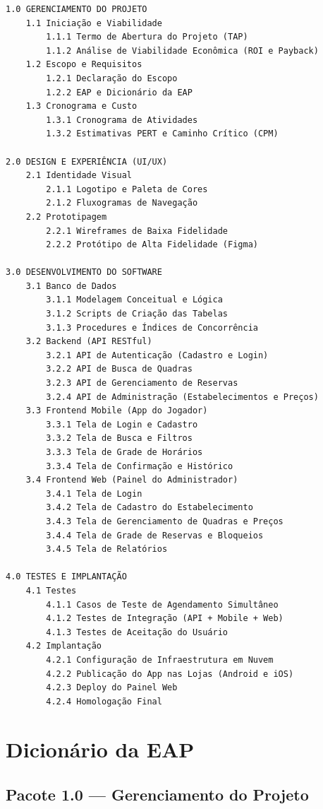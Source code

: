 \documentclass[12pt,a4paper,oneside]{report}
\begin{document}
\begin{footnotesize}
\begin{verbatim}
1.0 GERENCIAMENTO DO PROJETO
    1.1 Iniciação e Viabilidade
        1.1.1 Termo de Abertura do Projeto (TAP)
        1.1.2 Análise de Viabilidade Econômica (ROI e Payback)
    1.2 Escopo e Requisitos
        1.2.1 Declaração do Escopo
        1.2.2 EAP e Dicionário da EAP
    1.3 Cronograma e Custo
        1.3.1 Cronograma de Atividades
        1.3.2 Estimativas PERT e Caminho Crítico (CPM)

2.0 DESIGN E EXPERIÊNCIA (UI/UX)
    2.1 Identidade Visual
        2.1.1 Logotipo e Paleta de Cores
        2.1.2 Fluxogramas de Navegação
    2.2 Prototipagem
        2.2.1 Wireframes de Baixa Fidelidade
        2.2.2 Protótipo de Alta Fidelidade (Figma)

3.0 DESENVOLVIMENTO DO SOFTWARE
    3.1 Banco de Dados
        3.1.1 Modelagem Conceitual e Lógica
        3.1.2 Scripts de Criação das Tabelas
        3.1.3 Procedures e Índices de Concorrência
    3.2 Backend (API RESTful)
        3.2.1 API de Autenticação (Cadastro e Login)
        3.2.2 API de Busca de Quadras
        3.2.3 API de Gerenciamento de Reservas
        3.2.4 API de Administração (Estabelecimentos e Preços)
    3.3 Frontend Mobile (App do Jogador)
        3.3.1 Tela de Login e Cadastro
        3.3.2 Tela de Busca e Filtros
        3.3.3 Tela de Grade de Horários
        3.3.4 Tela de Confirmação e Histórico
    3.4 Frontend Web (Painel do Administrador)
        3.4.1 Tela de Login
        3.4.2 Tela de Cadastro do Estabelecimento
        3.4.3 Tela de Gerenciamento de Quadras e Preços
        3.4.4 Tela de Grade de Reservas e Bloqueios
        3.4.5 Tela de Relatórios

4.0 TESTES E IMPLANTAÇÃO
    4.1 Testes
        4.1.1 Casos de Teste de Agendamento Simultâneo
        4.1.2 Testes de Integração (API + Mobile + Web)
        4.1.3 Testes de Aceitação do Usuário
    4.2 Implantação
        4.2.1 Configuração de Infraestrutura em Nuvem
        4.2.2 Publicação do App nas Lojas (Android e iOS)
        4.2.3 Deploy do Painel Web
        4.2.4 Homologação Final
\end{verbatim}
\end{footnotesize}

\section{Dicionário da EAP}

\subsection{Pacote 1.0 --- Gerenciamento do Projeto}
\end{document}
